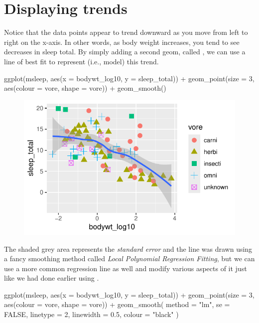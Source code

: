 \section{Displaying trends}

Notice that the data points appear to trend downward as you move from left to right on the x-axis. In other words, as body weight increases, you tend to see decreases in sleep total. By simply adding a second geom, called , we can use a line of best fit to represent (i.e., model) this trend.

\begin{inR}
ggplot(msleep, aes(x = bodywt_log10, y = sleep_total)) +
    geom_point(size = 3, aes(colour = vore, shape = vore)) +
    geom_smooth()
\end{inR}
\vspace{2em}
\begin{figure}[H]
\includegraphics[scale = 0.75]{graphics/ch2Figs/ggEx_10.pdf}
\end{figure}

The shaded grey area represents the \textit{standard error} and the line was drawn using a fancy smoothing method called \textit{Local Polynomial Regression Fitting}, but we can use a more common regression line as well and modify various aspects of it just like we had done earlier using .

\begin{inR}
ggplot(msleep, aes(x = bodywt_log10, y = sleep_total)) +
  geom_point(size = 3, aes(colour = vore, shape = vore)) +
  geom_smooth(
    method = "lm", se = FALSE,
    linetype = 2,
    linewidth = 0.5,
    colour = "black"
  )
\end{inR}

